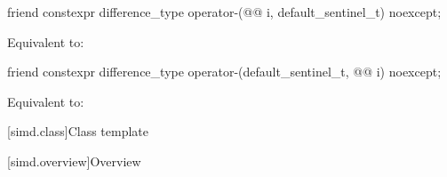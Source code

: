 \begin{itemdecl}
friend constexpr difference_type operator-(@@ i, default_sentinel_t) noexcept;
\end{itemdecl}

\begin{itemdescr}
\pnum
\effects
Equivalent to: 
\end{itemdescr}


\begin{itemdecl}
friend constexpr difference_type operator-(default_sentinel_t, @@ i) noexcept;
\end{itemdecl}

\begin{itemdescr}
\pnum
\effects
Equivalent to: 
\end{itemdescr}

[simd.class]{Class template }

[simd.overview]{Overview}

